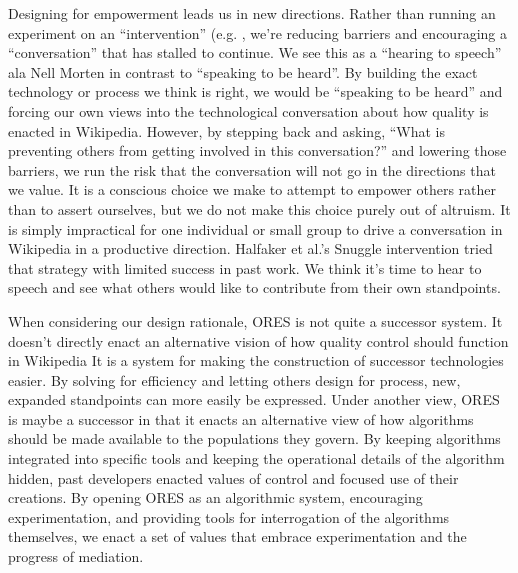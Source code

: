 Designing for empowerment leads us in new directions.  Rather than running an experiment on an ``intervention'' (e.g. \cite{halfaker2014snuggle}, we're reducing barriers and encouraging a ``conversation'' that has stalled to continue.  We see this as a ``hearing to speech'' ala Nell Morten\cite{morton1985journey} in contrast to ``speaking to be heard''.  By building the exact technology or process we think is right, we would be ``speaking to be heard'' and forcing our own views into the technological conversation about how quality is enacted in Wikipedia.  However, by stepping back and asking, ``What is preventing others from getting involved in this conversation?'' and lowering those barriers, we run the risk that the conversation will not go in the directions that we value.  It is a conscious choice we make to attempt to empower others rather than to assert ourselves, but we do not make this choice purely out of altruism.  It is simply impractical for one individual or small group to drive a conversation in Wikipedia in a productive direction.  Halfaker et al.'s Snuggle intervention\cite{halfaker2014snuggle} tried that strategy with limited success in past work.  We think it's time to hear to speech and see what others would like to contribute from their own standpoints.

When considering our design rationale, ORES is not quite a successor system.  It doesn't directly enact an alternative vision of how quality control should function in Wikipedia  It is a system for making the construction of successor technologies easier.  By solving for efficiency and letting others design for process, new, expanded standpoints can more easily be expressed.  Under another view, ORES is maybe a successor in that it enacts an alternative view of how algorithms should be made available to the populations they govern.  By keeping algorithms integrated into specific tools and keeping the operational details of the algorithm hidden, past developers enacted values of control and focused use of their creations.  By opening ORES as an algorithmic system, encouraging experimentation, and providing tools for interrogation of the algorithms themselves, we enact a set of values that embrace experimentation and the progress of mediation.

